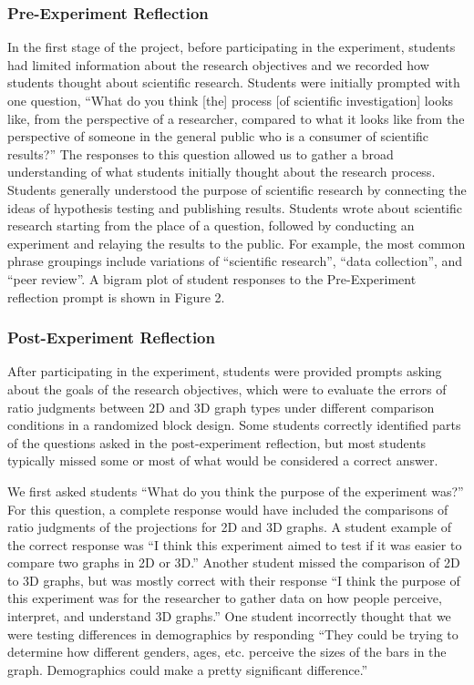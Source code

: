 \documentclass[
  12pt,
]{article}
\begin{document}
\subsubsection{Pre-Experiment
Reflection}\label{pre-experiment-reflection}

In the first stage of the project, before participating in the
experiment, students had limited information about the research
objectives and we recorded how students thought about scientific
research. Students were initially prompted with one question, ``What do
you think {[}the{]} process {[}of scientific investigation{]} looks
like, from the perspective of a researcher, compared to what it looks
like from the perspective of someone in the general public who is a
consumer of scientific results?'' The responses to this question allowed
us to gather a broad understanding of what students initially thought
about the research process. Students generally understood the purpose of
scientific research by connecting the ideas of hypothesis testing and
publishing results. Students wrote about scientific research starting
from the place of a question, followed by conducting an experiment and
relaying the results to the public. For example, the most common phrase
groupings include variations of ``scientific research'', ``data
collection'', and ``peer review''. A bigram plot of student responses to
the Pre-Experiment reflection prompt is shown in Figure 2.

\subsubsection{Post-Experiment
Reflection}\label{post-experiment-reflection}

After participating in the experiment, students were provided prompts
asking about the goals of the research objectives, which were to
evaluate the errors of ratio judgments between 2D and 3D graph types
under different comparison conditions in a randomized block design. Some
students correctly identified parts of the questions asked in the
post-experiment reflection, but most students typically missed some or
most of what would be considered a correct answer.

We first asked students ``What do you think the purpose of the
experiment was?'' For this question, a complete response would have
included the comparisons of ratio judgments of the projections for 2D
and 3D graphs. A student example of the correct response was ``I think
this experiment aimed to test if it was easier to compare two graphs in
2D or 3D.'' Another student missed the comparison of 2D to 3D graphs,
but was mostly correct with their response ``I think the purpose of this
experiment was for the researcher to gather data on how people perceive,
interpret, and understand 3D graphs.'' One student incorrectly thought
that we were testing differences in demographics by responding ``They
could be trying to determine how different genders, ages, etc. perceive
the sizes of the bars in the graph. Demographics could make a pretty
significant difference.''
\end{document}
